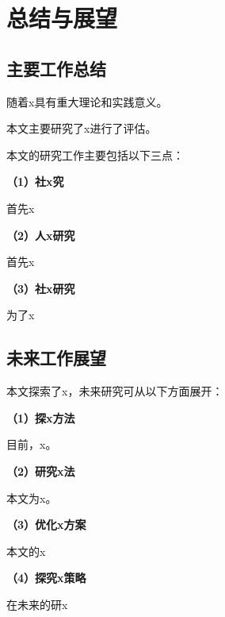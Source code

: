 
\chapter{总结与展望}
\section{主要工作总结}
随着x具有重大理论和实践意义。

本文主要研究了x进行了评估。

本文的研究工作主要包括以下三点：

\textbf{（1）社x究}

首先x


\textbf{（2）人x研究}

首先x



\textbf{（3）社x研究}

为了x

\section{未来工作展望}

本文探索了x，未来研究可从以下方面展开：

\textbf{（1）探x方法}

目前，x。



\textbf{（2）研究x法}

本文为x。

\textbf{（3）优化x方案}

本文的x


\textbf{（4）探究x策略}

在未来的研x